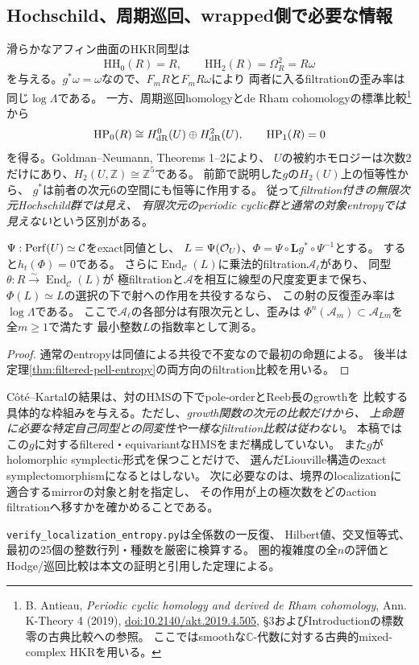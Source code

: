 \subsection{Hochschild、周期巡回、wrapped側で必要な情報}
滑らかなアフィン曲面のHKR同型は
\[
 \mathrm{HH}_0(R)=R,\qquad
 \mathrm{HH}_2(R)=\Omega_R^2=R\omega
\]
を与える。$g^*\omega=\omega$なので、$F_mR$と$F_mR\omega$により
両者に入るfiltrationの歪み率は同じ$\log\Lambda$である。
一方、周期巡回homologyとde Rham cohomologyの標準比較\footnote{
B. Antieau, \emph{Periodic cyclic homology and derived de Rham cohomology},
Ann. K-Theory 4 (2019),
\href{https://doi.org/10.2140/akt.2019.4.505}{doi:10.2140/akt.2019.4.505},
\S3およびIntroductionの標数零の古典比較への参照。
ここではsmoothな$\mathbb C$-代数に対する古典的mixed-complex HKRを用いる。}
から
\[
 \mathrm{HP}_0(R)\cong H^0_{\rm dR}(U)\oplus H^2_{\rm dR}(U),\qquad
 \mathrm{HP}_1(R)=0
\]
を得る。Goldman--Neumann\cite{BoundaryGoldmanNeumann}, Theorems 1--2により、
$U$の被約ホモロジーは次数2だけにあり、$H_2(U,\mathbb Z)\cong\mathbb Z^5$である。
前節で説明した$g$の$H_2(U)$上の恒等性から、
$g^*$は前者の次元$6$の空間にも恒等に作用する。
従って\emph{filtration付きの無限次元Hochschild群では見え、
有限次元のperiodic cyclic群と通常の対象entropyでは見えない}という区別がある。

\begin{proposition}[wrapped比較に対する十分条件と限界]
\label{prop:conditional-filtered-mirror-growth}
$\Psi:\operatorname{Perf}(U)\simeq\mathcal C$をexact同値とし、
$L=\Psi(\mathcal O_U)$、$\Phi=\Psi\circ\mathbf Lg^*\circ\Psi^{-1}$とする。
すると$h_t(\Phi)=0$である。
さらに$\operatorname{End}_{\mathcal C}(L)$に乗法的filtration$\mathcal A_\ell$があり、
同型$\theta:R\xrightarrow{\sim}\operatorname{End}_{\mathcal C}(L)$が
極filtrationと$\mathcal A$を相互に線型の尺度変更まで保ち、
$\Phi(L)\simeq L$の選択の下で射への作用を共役するなら、
この射の反復歪み率は$\log\Lambda$である。
ここで$\mathcal A_\ell$の各部分は有限次元とし、歪みは
$\Phi^n(\mathcal A_m)\subset\mathcal A_{Lm}$を全$m\ge1$で満たす
最小整数$L$の指数率として測る。
\end{proposition}
\begin{proof}
通常のentropyは同値による共役で不変なので最初の命題による。
後半は定理\ref{thm:filtered-pell-entropy}の両方向のfiltration比較を用いる。
\end{proof}

C\^ot\'{e}--Kartalの結果は、対のHMSの下でpole-orderとReeb長のgrowthを
比較する具体的な枠組みを与える。ただし、\emph{growth関数の次元の比較だけから、
上命題に必要な特定自己同型との同変性や一様なfiltration比較は従わない}。
本稿ではこの$g$に対するfiltered・equivariantなHMSをまだ構成していない。
また$g$がholomorphic symplectic形式を保つことだけで、
選んだLiouville構造のexact symplectomorphismになるとはしない。
次に必要なのは、境界のlocalizationに適合するmirrorの対象と射を指定し、
その作用が上の極次数をどのaction filtrationへ移すかを確かめることである。

\begin{remark}[再現計算]
\texttt{verify\_localization\_entropy.py}は全係数の一反復、
Hilbert値、交叉恒等式、最初の25個の整数行列・種数を厳密に検算する。
圏的複雑度の全$n$の評価とHodge/巡回比較は本文の証明と引用した定理による。
\end{remark}
